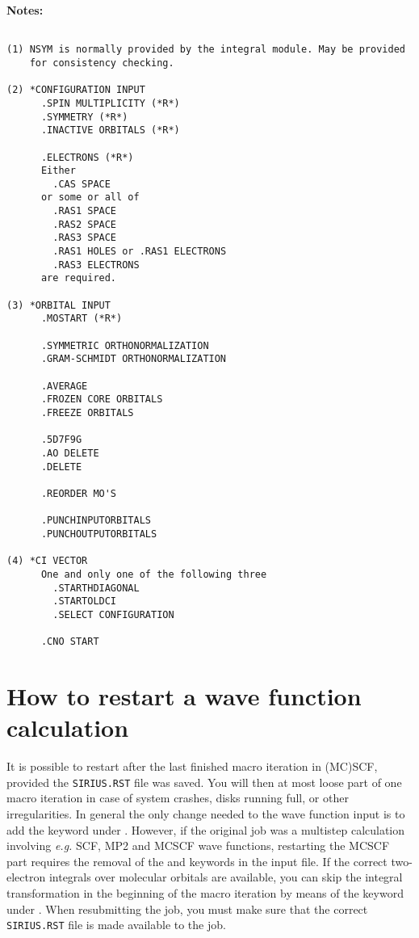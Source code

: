 {\bf Notes:}

\begin{verbatim}

(1) NSYM is normally provided by the integral module. May be provided
    for consistency checking.

(2) *CONFIGURATION INPUT
      .SPIN MULTIPLICITY (*R*)
      .SYMMETRY (*R*)
      .INACTIVE ORBITALS (*R*)

      .ELECTRONS (*R*)
      Either
        .CAS SPACE
      or some or all of
        .RAS1 SPACE
        .RAS2 SPACE
        .RAS3 SPACE
        .RAS1 HOLES or .RAS1 ELECTRONS
        .RAS3 ELECTRONS
      are required.

(3) *ORBITAL INPUT
      .MOSTART (*R*)

      .SYMMETRIC ORTHONORMALIZATION
      .GRAM-SCHMIDT ORTHONORMALIZATION

      .AVERAGE
      .FROZEN CORE ORBITALS
      .FREEZE ORBITALS

      .5D7F9G
      .AO DELETE
      .DELETE

      .REORDER MO'S

      .PUNCHINPUTORBITALS
      .PUNCHOUTPUTORBITALS

(4) *CI VECTOR
      One and only one of the following three
        .STARTHDIAGONAL
        .STARTOLDCI
        .SELECT CONFIGURATION

      .CNO START
\end{verbatim}

\pagebreak[3]
\section{\label{sec:ig_restart} How to restart a wave function calculation}

It is possible to restart after the last finished
macro iteration in (MC)SCF, provided the \verb|SIRIUS.RST|
file was saved.  You will then at most
loose part of one macro iteration in case of system crashes, disks
running full, or other irregularities. \noindent In general the
only change needed to the wave function input is to add the
 keyword under . However, if the
original job was a multistep calculation involving {\it e.g.\/} SCF,
MP2 and MCSCF wave functions, restarting the MCSCF part requires the
removal of the  and  keywords in the input
file. If the correct
two-electron integrals over molecular orbitals are available, you
can skip the integral transformation in the beginning of the macro iteration by means
of the  keyword under
. When resubmitting the job, you must make
sure that the correct \verb|SIRIUS.RST| file is
made available to the job.

